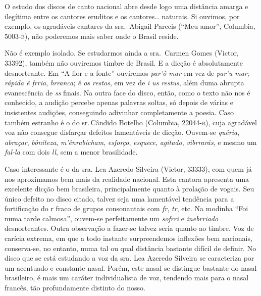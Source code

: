 O estudo dos discos de canto nacional abre desde logo uma distância
amarga e ilegítima entre os cantores eruditos e os cantores\ldots{} naturais.
Si ouvimos, por exemplo, os agradáveis cantares da sra.\, Abigail Parecis
(``Meu amor'', Columbia, 5003-\textsc{b}), não poderemos mais saber onde o Brasil
reside.

Não é exemplo isolado. Se estudarmos ainda a sra.\, Carmen Gomes (Victor,
33392), também não ouviremos timbre de Brasil. E a dicção é
absolutamente desnorteante. Em ``A flor e a fonte'' ouviremos \textit{par'ô
mar} em vez de \textit{par'u mar}; \textit{rápida ê frria}, \textit{brranca}; \textit{ê
os restos}, em vez de \textit{i us restus}, além duma abrupta evanescência
de \textit{ss} finais. Na outra face do disco, então, como o texto não nos é
conhecido, a audição percebe apenas palavras soltas, só depois de várias
e insistentes audições, conseguindo adivinhar completamente a poesia.
Caso também estranho é o do sr.\,Cândido Botelho (Columbia, 22044-\textsc{b}),
cuja agradável voz não consegue disfarçar defeitos lamentáveis de
dicção. Ouvem-se \textit{quêria}, \textit{abraçar}, \textit{bôniteza},
\textit{m'ênrabicham}, \textit{esforço}, \textit{esquece}, \textit{agitado}, \textit{vibrrarás},
e mesmo um \textit{fal-la} com dois \textit{ll}, sem a menor brasilidade.

Caso interessante é o da sra.\,\,Lea Azeredo Silveira (Victor, 33333), com
quem já nos aproximamos bem mais da realidade nacional. Esta cantora
apresenta uma excelente dicção bem brasileira, principalmente quanto à
prolação de vogais. Seu único defeito no disco citado, talvez seja uma
lamentável tendência para a fortificação do r fraco de grupos
consonantais com \textit{fr}, \textit{tr}, etc. Na modinha ``Foi numa tarde calmosa'',
ouvem-se perfeitamente um \textit{sofrri} e \textit{inebrriado} desnorteantes.
Outra observação a fazer-se talvez seria quanto ao timbre. Voz de
carícia extrema, em que a todo instante surpreendemos inflexões bem
nacionais, conserva-se, no entanto, numa tal ou qual distância bastante
difícil de definir. No disco que se está estudando a voz da sra.\,\,Lea
Azeredo Silveira se caracteriza por um acentuado e constante nasal.
Porém, este nasal se distingue bastante do nasal brasileiro, é mais um
caráter individualista de voz, tendendo mais para o nasal francês, tão
profundamente distinto do nosso.

